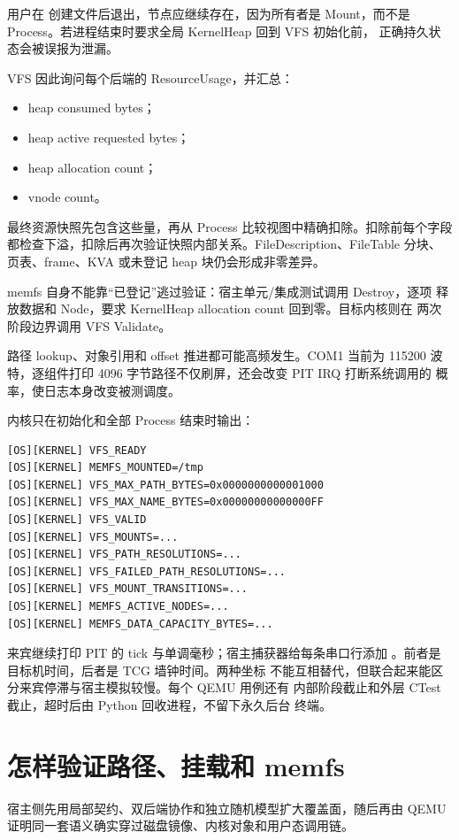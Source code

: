 用户在  创建文件后退出，节点应继续存在，因为所有者是
Mount，而不是 Process。若进程结束时要求全局 KernelHeap 回到 VFS 初始化前，
正确持久状态会被误报为泄漏。

VFS 因此询问每个后端的 ResourceUsage，并汇总：

\begin{itemize}
  \item heap consumed bytes；
  \item heap active requested bytes；
  \item heap allocation count；
  \item vnode count。
\end{itemize}

最终资源快照先包含这些量，再从 Process 比较视图中精确扣除。扣除前每个字段
都检查下溢，扣除后再次验证快照内部关系。FileDescription、FileTable 分块、
页表、frame、KVA 或未登记 heap 块仍会形成非零差异。

memfs 自身不能靠“已登记”逃过验证：宿主单元/集成测试调用 Destroy，逐项
释放数据和 Node，要求 KernelHeap allocation count 回到零。目标内核则在
两次阶段边界调用 VFS Validate。

路径 lookup、对象引用和 offset 推进都可能高频发生。COM1 当前为 115200
波特，逐组件打印 4096 字节路径不仅刷屏，还会改变 PIT IRQ 打断系统调用的
概率，使日志本身改变被测调度。

内核只在初始化和全部 Process 结束时输出：

\begin{lstlisting}[caption={VFS 的有界阶段日志}]
[OS][KERNEL] VFS_READY
[OS][KERNEL] MEMFS_MOUNTED=/tmp
[OS][KERNEL] VFS_MAX_PATH_BYTES=0x0000000000001000
[OS][KERNEL] VFS_MAX_NAME_BYTES=0x00000000000000FF
[OS][KERNEL] VFS_VALID
[OS][KERNEL] VFS_MOUNTS=...
[OS][KERNEL] VFS_PATH_RESOLUTIONS=...
[OS][KERNEL] VFS_FAILED_PATH_RESOLUTIONS=...
[OS][KERNEL] VFS_MOUNT_TRANSITIONS=...
[OS][KERNEL] MEMFS_ACTIVE_NODES=...
[OS][KERNEL] MEMFS_DATA_CAPACITY_BYTES=...
\end{lstlisting}

来宾继续打印 PIT 的 tick 与单调毫秒；宿主捕获器给每条串口行添加
\code{[QEMU][T+...ms]}。前者是目标机时间，后者是 TCG 墙钟时间。两种坐标
不能互相替代，但联合起来能区分来宾停滞与宿主模拟较慢。每个 QEMU 用例还有
内部阶段截止和外层 CTest 截止，超时后由 Python 回收进程，不留下永久后台
终端。

\section{怎样验证路径、挂载和 memfs}
宿主侧先用局部契约、双后端协作和独立随机模型扩大覆盖面，随后再由 QEMU
证明同一套语义确实穿过磁盘镜像、内核对象和用户态调用链。


